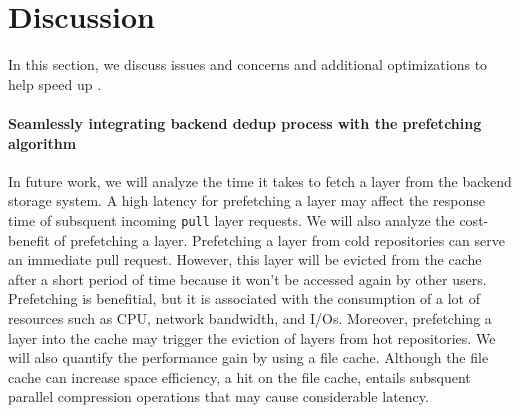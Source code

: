 \section{Discussion}
\label{sec:discussion}
In this section, we discuss issues and concerns 
and additional optimizations to help speed up \sysname.

\paragraph{Seamlessly integrating backend dedup process with the prefetching algorithm}

In future work, we will analyze the time it takes to fetch a layer from the backend storage system.
A high latency for prefetching a layer may affect the response time of subsquent incoming \texttt{pull} layer requests.
We will also analyze the cost-benefit of prefetching a layer.
Prefetching a layer from cold repositories can serve an immediate pull request. 
However, this layer will be evicted from the cache after a short period of time because it won't be accessed again by other users. 
Prefetching is benefitial, but it is associated with the consumption of a lot of resources such as CPU, network bandwidth, and I/Os. 
Moreover, prefetching a layer into the cache may trigger the eviction of layers from hot repositories.
We will also quantify the performance gain by using a file cache.
Although the file cache can increase space efficiency, a hit on the file cache,
entails subsquent parallel compression operations that may cause considerable latency.

